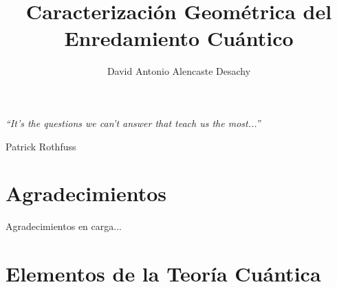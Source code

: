 \documentclass[letterpaper,spanish,12pt]{book}
\author{David Antonio Alencaste Desachy}
\title{Caracterización Geométrica del Enredamiento Cuántico}
\begin{document}
\frontmatter

\maketitle %

\chapter*{}

\vspace*{3cm}

\begin{flushright}
{\selectfont
\emph{``It's the questions we can't answer that teach us the most...''}

\vspace{5mm}
Patrick Rothfuss
}
\end{flushright}

\vfill
\chapter{Agradecimientos}
Agradecimientos en carga...

\begin{center}
\end{center}

\tableofcontents %
\mainmatter 
%

\chapter{Elementos de la Teoría Cuántica}


%
\end{document}
